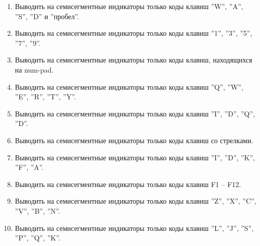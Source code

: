 \begin{enumerate}
  
  \setlength\itemsep{1em}

  \item{
  Выводить на семисегментные индикаторы только коды клавиш ''W'', ''A'', ''S'', ''D'' и ''пробел''.
  }

  \item{
  Выводить на семисегментные индикаторы только коды клавиш ''1'', ''3'', ''5'', ''7'', ''9''.
  }

  \item{
  Выводить на семисегментные индикаторы только коды клавиш, находящихся на num-pad.
  }

  \item{
  Выводить на семисегментные индикаторы только коды клавиш ''Q'', ''W'', ''E'', ''R'', ''T'', ''Y''.
  }

  \item{
  Выводить на семисегментные индикаторы только коды клавиш ''I'', ''D'', ''Q'', ''D''.
  }

  \item{
  Выводить на семисегментные индикаторы только коды клавиш со стрелками.
  }

  \item{
  Выводить на семисегментные индикаторы только коды клавиш ''I'', ''D'', ''K'', ''F'', ''A''.
  }

  \item{
  Выводить на семисегментные индикаторы только коды клавиш F1 -- F12.
  }

  \item{
  Выводить на семисегментные индикаторы только коды клавиш ''Z'', ''X'', ''C'', ''V'', ''B'', ''N''.
  }

  \item{
  Выводить на семисегментные индикаторы только коды клавиш ''L'', ''J'', ''S'', ''P'', ''Q'', ''K''.
  }

\end{enumerate}
